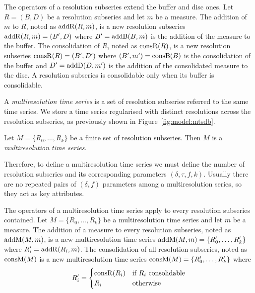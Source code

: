 The operators of a resolution subseries extend the buffer and disc
ones. Let $R=(B,D)$ be a resolution subseries and let $m$ be a
measure.  The addition of $m$ to $R$, noted as $\operatorname{addR}(R,m)$, is a new
resolution subseries $\operatorname{addR}(R,m)=(B',D)$ where $B'= \operatorname{addB}(B,m)$ is the
addition of the measure to the buffer.  The consolidation of $R$,
noted as $\operatorname{consR}(R)$, is a new resolution subseries
$\operatorname{consR}(R)=(B',D')$ where $(B',m') = \operatorname{consB}(B)$ is the consolidation
of the buffer and $D'= \operatorname{addD}(D,m')$ is the addition of the
consolidated measure to the disc. A resolution subseries is
consolidable only when its buffer is consolidable.

A \emph{multiresolution time series} is a set of resolution subseries
referred to the same time series. We store a time series regularised
with distinct resolutions across the resolution subseries, as
previously shown in Figure~\ref{fig:model:mtsdb}.

\begin{definition}
  Let $M=\{R_0, \dots, R_k\}$ be a finite set of resolution
  subseries. Then $M$ is a \emph{multiresolution time series}.
\end{definition}

Therefore, to define a multiresolution time series we must define the
number of resolution subseries and its corresponding parameters
$(\delta,\tau,f,k)$.  Usually there are no repeated pairs of
$(\delta,f)$ parameters among a multiresolution series, so they act as
key attributes.

The operators of a multiresolution time series apply to every
resolution subseries contained. Let $M=\{R_0,\allowbreak
\dots,\allowbreak R_k\}$ be a multiresolution time series and let $m$
be a measure.
%
The addition of a measure to every resolution subseries, noted as
$\operatorname{addM}(M,m)$, is a new multiresolution time series $\operatorname{addM}(M,m)=\{R'_0,
\dots,\allowbreak R'_k\}$ where $R'_i=\operatorname{addR}(R_i,m)$. The consolidation
of all resolution subseries, noted as $\operatorname{consM}(M)$ is a new
multiresolution time series $\operatorname{consM}(M)=\{R'_0,\allowbreak
\dots,\allowbreak R'_k\}$ where
\[R'_i=
\begin{cases}
\operatorname{consR}(R_i) & \text{if } R_i \text{ consolidable}\\
 R_i & \text{otherwise}
\end{cases}
\]







